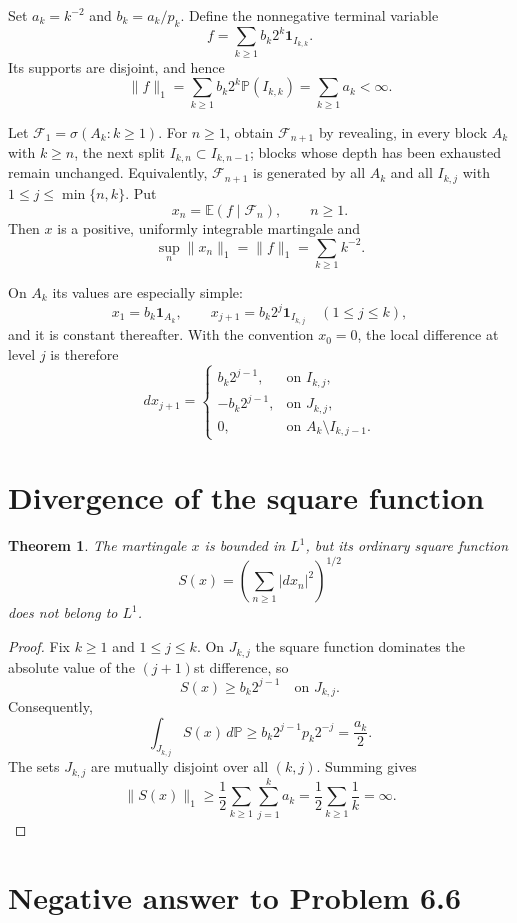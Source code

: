 \documentclass[11pt]{article}
\newtheorem{theorem}{Theorem}
\newcommand{\E}{\mathbb E}
\newcommand{\F}{\mathcal F}
\begin{document}
Set $a_k=k^{-2}$ and $b_k=a_k/p_k$.  Define the nonnegative terminal
variable
\[
 f=\sum_{k\ge1} b_k2^k\mathbf1_{I_{k,k}}.
\]
Its supports are disjoint, and hence
\[
 \|f\|_1=\sum_{k\ge1}b_k2^k\mathbb P(I_{k,k})
        =\sum_{k\ge1}a_k<\infty.
\]

Let $\F_1=\sigma(A_k:k\ge1)$.  For $n\ge1$, obtain $\F_{n+1}$ by
revealing, in every block $A_k$ with $k\ge n$, the next split
$I_{k,n}\subset I_{k,n-1}$; blocks whose depth has been exhausted remain
unchanged.  Equivalently, $\F_{n+1}$ is generated by all $A_k$ and all
$I_{k,j}$ with $1\le j\le\min\{n,k\}$.  Put
\[
 x_n=\E(f\mid\F_n),\qquad n\ge1.
\]
Then $x$ is a positive, uniformly integrable martingale and
\[
 \sup_n\|x_n\|_1=\|f\|_1=\sum_{k\ge1}k^{-2}.
\]

On $A_k$ its values are especially simple:
\[
 x_1=b_k\mathbf1_{A_k},\qquad
 x_{j+1}=b_k2^j\mathbf1_{I_{k,j}}\quad(1\le j\le k),
\]
and it is constant thereafter.  With the convention $x_0=0$, the local
difference at level $j$ is therefore
\[
 dx_{j+1}=
 \begin{cases}
  b_k2^{j-1},&\text{on }I_{k,j},\\
 -b_k2^{j-1},&\text{on }J_{k,j},\\
 0,&\text{on }A_k\setminus I_{k,j-1}.
 \end{cases}
\]

\section{Divergence of the square function}

\begin{theorem}\label{thm:counterexample}
The martingale $x$ is bounded in $L^1$, but its ordinary square function
\[
 S(x)=\left(\sum_{n\ge1}|dx_n|^2\right)^{1/2}
\]
does not belong to $L^1$.
\end{theorem}

\begin{proof}
Fix $k\ge1$ and $1\le j\le k$.  On $J_{k,j}$ the square function
dominates the absolute value of the $(j+1)$st difference, so
\[
 S(x)\ge b_k2^{j-1}\quad\text{on }J_{k,j}.
\]
Consequently,
\[
 \int_{J_{k,j}}S(x)\,d\mathbb P
 \ge b_k2^{j-1}p_k2^{-j}=\frac{a_k}{2}.
\]
The sets $J_{k,j}$ are mutually disjoint over all $(k,j)$.  Summing gives
\[
 \|S(x)\|_1
 \ge\frac12\sum_{k\ge1}\sum_{j=1}^k a_k
 =\frac12\sum_{k\ge1}\frac1k=\infty.
\]
\end{proof}

\section{Negative answer to Problem 6.6}
\end{document}

